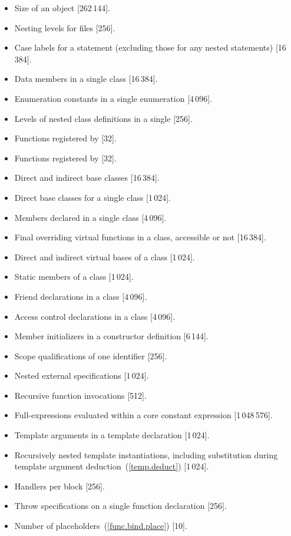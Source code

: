 \begin{paras}
\begin{itemize}
\item%
Size of an object [262\,144].
\item%
Nesting levels for
files [256].
\item%
Case labels for a
statement (excluding those for any nested
statements)
[16\,384].
\item%
Data members in a single class [16\,384].
\item%
Enumeration constants in a single enumeration [4\,096].
\item%
Levels of nested class definitions
in a single
[256].
\item%
Functions registered by
 [32].
\item%
Functions registered by
 [32].
\item%
Direct and indirect base classes [16\,384].
\item%
Direct base classes for a single class [1\,024].
\item%
Members declared in a single class [4\,096].
\item%
Final overriding virtual functions in a class,
accessible or not [16\,384].
\item%
Direct and indirect virtual bases of a class [1\,024].
\item%
Static members of a class [1\,024].
\item%
Friend declarations in a class [4\,096].
\item%
Access control declarations in a class [4\,096].
\item%
Member initializers in a constructor definition [6\,144].
\item%
Scope qualifications of one identifier [256].
\item%
Nested external specifications [1\,024].
\item%
Recursive  function invocations [512].
\item%
Full-expressions evaluated within a core constant expression [1\,048\,576].
\item%
Template arguments in a template declaration [1\,024].
\item%
Recursively nested template instantiations, including substitution
during template argument deduction~(\ref{temp.deduct}) [1\,024].
\item%
Handlers per
block [256].
\item%
Throw specifications on a single function declaration [256].

\item%
Number of placeholders~(\ref{func.bind.place}) [10].

\end{itemize}

\end{paras}
